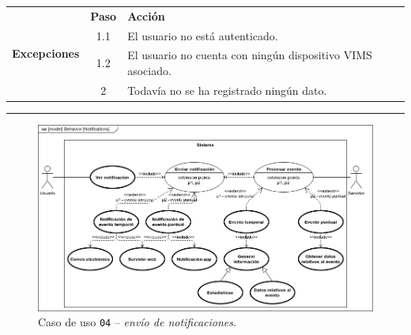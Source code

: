 \begin{table}[H]
\begin{tabularx}{\textwidth}{|c|c|X|}
    \hline
    \multirow{4}{*}{\textbf{Excepciones}}      & \textbf{Paso}                                                                                                                                                         & \textbf{Acción}                                                                                                                                 \\
    \cline{2-3}
                                               & 1.1                                                                                                                                                                   & \multicolumn{1}{L|}{El usuario no está autenticado.}                                                                                            \\
    \cline{2-3}
                                               & 1.2                                                                                                                                                                   & \multicolumn{1}{L|}{El usuario no cuenta con ningún dispositivo \ac{VIMS} asociado.}                                                            \\
    \cline{2-3}
                                               & 2                                                                                                                                                                     & \multicolumn{1}{L|}{Todavía no se ha registrado ningún dato.}                                                                                   \\
    \hline
  \end{tabularx}
\end{table}

\noindent\rule{\linewidth}{.2pt}

\begin{figure}[H]
  \centering
  \includegraphics[width=\linewidth]{diagrams/UseCases-UC4 - notifications.png}
  \caption{Caso de uso \texttt{04} -- \textit{envío de notificaciones}.}
  \label{uc:notifications}
\end{figure}

